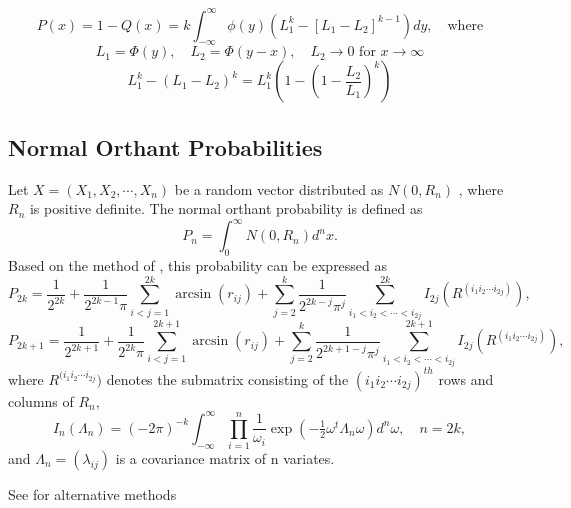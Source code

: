 \begin{equation}
	P(x) = 1 - Q(x) = k  \int_{-\infty}^\infty \phi(y) \left( L_1^k - [L_1 - L_2]^{k-1} \right) dy, \quad \text{where}
\end{equation}
\begin{equation}
	L_1 = \Phi(y), \quad L_2 = \Phi(y-x), \quad L_2 \rightarrow 0 \text{ for } x \rightarrow \infty
\end{equation}
\begin{equation}
	L_1^k - (L_1 - L_2)^k = L_1^k \left( 1 - \left( 1 - \frac{L_2}{L_1} \right) ^k \right) 
\end{equation}





\subsection{Normal Orthant Probabilities}
\label{NormalOrthantProbabilities}
Let $X=(X_1, X_2, \cdots , X_n)$  be a random vector distributed as $N(0,R_n)$ , where $R_n$ is positive definite. The normal orthant probability is defined as
\begin{equation}
	P_n = \int_0^\infty N(0,R_n) d^n x.
\end{equation}
Based on the method of \cite{Sun_1988_Therory, Sun_1988_Computation}, this probability can be expressed as
\begin{equation}
	P_{2k}=  \frac{1}{2^{2k}} + \frac{1}{2^{2k-1}\pi} \sum_{i<j=1}^{2k}{\arcsin(r_{ij})} + \sum_{j=2}^{k}{\frac{1}{2^{2k-j}\pi^j}}   \sum_{i_1<i_2<\cdots<i_{2j}}^{2k}{I_{2j}(R^{(i_1i_2\cdots i_{2j})})},    
\end{equation}
\begin{equation}
	P_{2k+1}=  \frac{1}{2^{2k+1}} + \frac{1}{2^{2k}\pi} \sum_{i<j=1}^{2k+1}{\arcsin(r_{ij})} + \sum_{j=2}^{k}{\frac{1}{2^{2k+1-j}\pi^j}}   \sum_{i_1<i_2<\cdots<i_{2j}}^{2k+1}{I_{2j}(R^{(i_1i_2\cdots i_{2j})})},    
\end{equation}
where $R^{(i_1i_2\cdots i_{2j}})$ denotes the submatrix consisting of the $(i_1i_2\cdots i_{2j})^{th}$ rows and columns of $R_n$,
\begin{equation}
	I_n(\Lambda_n) = (-2\pi)^{-k}  \int_{-\infty}^\infty \prod_{i=1}^n \frac{1}{\omega_i} \exp(-\tfrac{1}{2} \omega^t \Lambda_n \omega) d^n \omega, \quad n=2k,
\end{equation}
and $\Lambda_n=(\lambda_{ij})$ is a covariance matrix of n variates.

See \cite{Genz_2002, Genz_2009} for alternative methods

